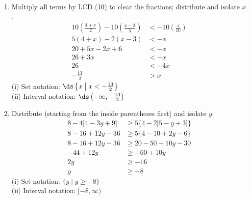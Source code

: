 \documentclass{ximera}
\begin{document}
\begin{problem}
\begin{solution}
\begin{enumerate}
  \item[(c)] Multiply all terms by LCD (10) to clear the fractions; distribute and isolate $x$.
  \begin{align*}
    10\!\left(\frac{4+x}{2}\right) - 10\!\left(\frac{x-3}{5}\right) &< -10\!\left(\frac{x}{10}\right)\\
    5(4+x) - 2(x-3) &< -x\\
    20 + 5x - 2x + 6 &< -x\\
    26 + 3x &< -x\\
    26 &< -4x\\
    -\frac{13}{2} &> x
  \end{align*}
  (i) Set notation: $\ds\left\{x\;\middle|\;x< -\frac{13}{2}\right\}$\\
  (ii) Interval notation: $\ds\left(-\infty,-\frac{13}{2}\right)$

  \item[(d)] Distribute (starting from the inside parentheses first) and isolate $y$.
  \begin{align*}
    8 - 4\big[4 - 3y+9\big] &\geq 5\Big\{4-2\big[5-y+3\big]\Big\}\\
    8 - 16 + 12y - 36 &\geq 5\Big\{4 - 10 + 2y - 6\Big\}\\
    8 - 16 + 12y - 36 &\geq 20 - 50 + 10y - 30\\
    -44 + 12y &\geq -60 + 10y\\
    2y &\geq -16\\
    y &\geq -8
  \end{align*}
  (i) Set notation: $\{y \mid y\geq -8\}$\\
  (ii) Interval notation: $[-8,\infty)$
\end{enumerate}
\end{solution}
\end{problem}
\end{document}
